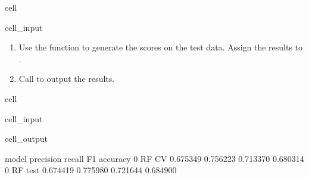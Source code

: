 \documentclass[letterpaper,10pt,english]{sphinxmanual}
\begin{document}
\begin{sphinxuseclass}{cell}
\begin{sphinxuseclass}{cell_input}
\begin{sphinxVerbatim}[commandchars=\\\{\}]
     
\end{sphinxVerbatim}

\end{sphinxuseclass}
\end{sphinxuseclass}\begin{enumerate}
%
\item {} 
\sphinxAtStartPar
Use the  function to generate the scores on the test data. Assign the results to .

\item {} 
\sphinxAtStartPar
Call  to output the results.

\end{enumerate}

\begin{sphinxuseclass}{cell}
\begin{sphinxuseclass}{cell_input}
\begin{sphinxVerbatim}[commandchars=\\\{\}]
    
  \PYG{p}{[} \PYG{p}{]} 
\end{sphinxVerbatim}

\end{sphinxuseclass}
\begin{sphinxuseclass}{cell_output}
\begin{sphinxVerbatim}[commandchars=\\\{\}]
     model  precision    recall        F1  accuracy
0    RF CV   0.675349  0.756223  0.713370  0.680314
0  RF test   0.674419  0.775980  0.721644  0.684900
\end{sphinxVerbatim}

\end{sphinxuseclass}
\end{sphinxuseclass}
\end{document}
